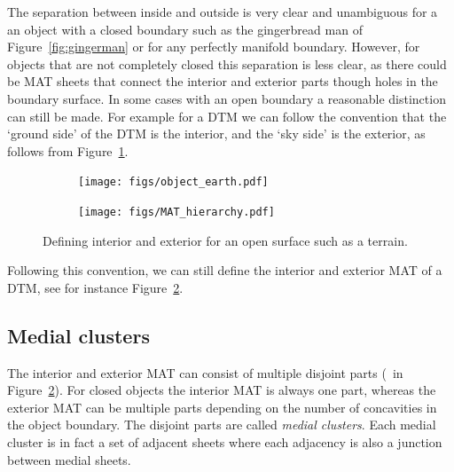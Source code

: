 The separation between inside and outside is very clear and unambiguous for a an object with a closed boundary such as the gingerbread man of Figure~\ref{fig:gingerman} or for any perfectly manifold boundary.
However, for objects that are not completely closed this separation is less clear, as there could be MAT sheets that connect the interior and exterior parts though holes in the boundary surface.
In some cases with an open boundary a reasonable distinction can still be made.
For example for a DTM we can follow the convention that the `ground side' of the DTM is the interior, and the `sky side' is the exterior, as follows from Figure~\ref{fig:object_earth}.
\begin{figure}
	\centering
	\begin{subfigure}{0.4\linewidth}
		\texttt{[image: figs/object\_earth.pdf]}
	\label{fig:object_earth}
	\end{subfigure}
	\quad
	\begin{subfigure}{0.57\linewidth}
		\texttt{[image: figs/MAT\_hierarchy.pdf]}
		\label{fig:matterrain}
	\end{subfigure}
	\caption{Defining interior and exterior for an open surface such as a terrain.}
	\label{fig:intext}
\end{figure}
Following this convention, we can still define the interior and exterior MAT of a DTM, see for instance Figure~\ref{fig:matterrain}.

\subsection{Medial clusters}
The interior and exterior MAT can consist of multiple disjoint parts (\eg\ in Figure~\ref{fig:matterrain}).
For closed objects the interior MAT is always one part, whereas the exterior MAT can be multiple parts depending on the number of concavities in the object boundary.
The disjoint parts are called \emph{medial clusters}.
Each medial cluster is in fact a set of adjacent sheets where each adjacency is also a junction between medial sheets.

